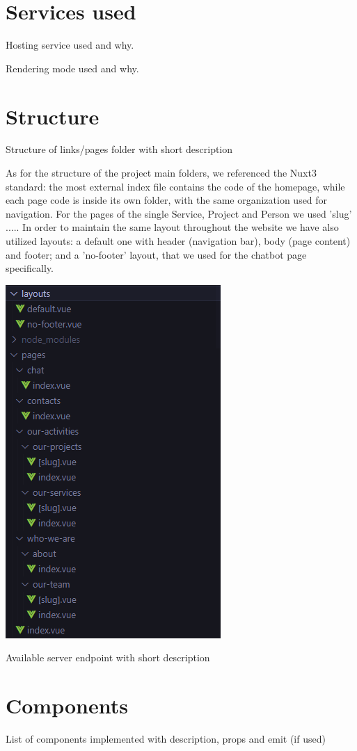 \section{Services used}
Hosting service used and why.

Rendering mode used and why.

\section{Structure}
Structure of links/pages folder with short description

As for the structure of the project main folders, we referenced the Nuxt3 standard: the most external index file 
contains the code of the homepage, while each page code is inside its own folder, with the same organization used for navigation.
For the pages of the single Service, Project and Person we used 'slug' .....
In order to maintain the same layout throughout the website we have also utilized layouts: a default one with header (navigation bar), body (page content) and footer;
and a 'no-footer' layout, that we used for the chatbot page specifically.


\begin{center}
    \includegraphics[width=0.25\linewidth]{img/folders-structure.png}
\end{center}

\vspace{1em}
Available server endpoint with short description

\section{Components}
List of components implemented with description, props and emit (if used)


